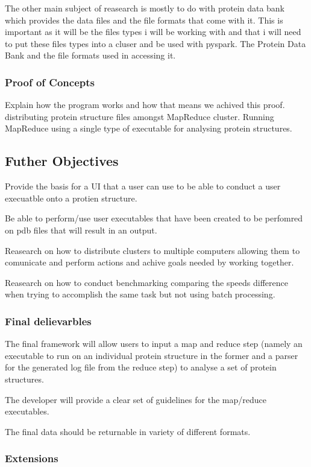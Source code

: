 \documentclass{report}
\begin{document}
The other main subject of reasearch is mostly to do with protein data bank which provides the data files and the file formats that come with it. This is important as it will be the files types i will be working with and that i will need to put these files types into a cluser and be used with pyspark.
The Protein Data Bank and the file formats used in accessing it.


\subsubsection{Proof of Concepts}
Explain how the program works and how that means we achived this proof.
distributing protein structure files amongst MapReduce cluster.
Running MapReduce using a single type of executable for analysing protein structures.

\subsection{Futher Objectives}

Provide the basis for a UI that a user can use to be able to conduct a user execuatble onto a protien structure.

Be able to perform/use user executables that have been created to be perfomred on pdb files that will result in an output.

Reasearch on how to distribute clusters to multiple computers allowing them to comunicate and perform actions and achive goals needed by working together.

Reasearch on how to conduct benchmarking comparing the speeds difference when trying to accomplish the same task but not using batch processing.

\subsubsection{Final delievarbles}

The final framework will allow users to input a map and reduce step (namely an executable to run on an individual protein structure in the former and a parser for the generated log file from the reduce step) to analyse a set of protein structures.

The developer will provide a clear set of guidelines for the map/reduce executables.

The final data should be returnable in variety of different formats.


\subsubsection{Extensions}
\end{document}
